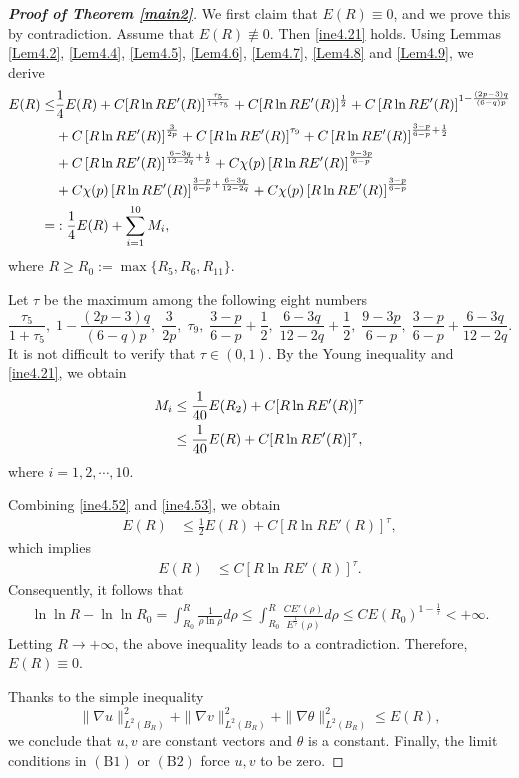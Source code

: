 \documentclass[11pt,reqno]{amsart}
\numberwithin{Thm}{section}
\begin{document}
\begin{proof}[{\bf Proof of Theorem \ref{main2}}]
We first claim that $E(R)\equiv0$, and we prove this by contradiction.
Assume that $E(R)\not\equiv0$. Then \eqref{ine4.21} holds. Using Lemmas \ref{Lem4.2}, \ref{Lem4.4}, \ref{Lem4.5}, \ref{Lem4.6}, \ref{Lem4.7}, \ref{Lem4.8} and \ref{Lem4.9}, we derive
\begin{align}\label{ine4.52}
E(R)\leq &\frac{1}{4} E(R)+C[R\ln RE'(R)]^\frac{\tau_5}{1+\tau_5}+C[R\ln RE'(R)]^\frac{1}{2}+C\left[R\ln R E'(R)\right]^{1-\frac{(2p-3)q}{(6-q)p}}\notag\\
&+C\left[R\ln R E'(R)\right]^\frac{3}{2p}+C\left[R\ln RE'(R)\right]^{\tau_9}+C\left[R\ln RE'(R)\right]^{\frac{3-p}{6-p}+\frac{1}{2}}\notag\\
&+C\left[R\ln RE'(R)\right]^{\frac{6-3q}{12-2q}+\frac{1}{2}}+C\chi(p)\left[R\ln RE'(R)\right]^\frac{9-3p}{6-p}\\
&+C\chi(p)\left[R\ln RE'(R)\right]^{\frac{3-p}{6-p}+\frac{6-3q}{12-2q}}+C\chi(p)\left[R\ln RE'(R)\right]^{\frac{3-p}{6-p}}\notag\\
=&:\frac{1}{4} E(R)+\sum_{i=1}^{10}M_i,\notag
\end{align}
where $R\geq R_0:=\max\{R_5,R_6,R_{11}\}$.


Let $\tau$ be the maximum among the following eight numbers
$$
\frac{\tau_5}{1+\tau_5},\;1-\frac{(2p-3)q}{(6-q)p},\;\frac{3}{2p},\;\tau_9,\;\frac{3-p}{6-p}+\frac{1}{2},\;\frac{6-3q}{12-2q}+\frac{1}{2},\;\frac{9-3p}{6-p},\; \frac{3-p}{6-p}+\frac{6-3q}{12-2q}.
$$
It is not difficult to verify that $\tau\in(0,1)$.
By the Young inequality and \eqref{ine4.21}, we obtain
\begin{align}\label{ine4.53}
	M_i&\leq \frac{1}{40}E(R_2)+C[R\ln R E'(R)]^\tau\notag\\
&\leq \frac{1}{40}E(R)+C[R\ln R E'(R)]^\tau,
\end{align}
where  $i=1,2,\cdots,10$.


Combining \eqref{ine4.52} and \eqref{ine4.53}, we obtain
\begin{align*}
E(R)&\leq \frac{1}{2}E(R)+C[R\ln R E'(R)]^\tau,
\end{align*}
	which implies
	\begin{align*}
		E(R)
		&\leq C\left[R\ln RE'(R)\right]^\tau.
	\end{align*}
	Consequently, it follows that
	\begin{align*}
		\ln\ln R-\ln\ln R_0=\int_{R_0}^{R}\frac{1}{\rho\ln\rho}d\rho\leq\int_{R_0}^{R}\frac{CE'(\rho)}{E^{\frac{1}{\tau}}(\rho)}d\rho\leq CE(R_0)^{1-\frac{1}{\tau}}<+\infty.
	\end{align*}
	Letting $R\rightarrow+\infty$, the above inequality leads to a contradiction. Therefore, $E(R)\equiv0$.
	
	Thanks to the simple inequality
	$$\|\nabla u\|_{L^2(B_R)}^2+\|\nabla v\|_{L^2(B_R)}^2+\|\nabla \theta\|_{L^2(B_R)}^2\leq E(R),$$
	we conclude that $u,v$ are constant vectors and $\theta$ is a constant. Finally, the limit conditions in $\mathrm{(B1)}$ or $\mathrm{(B2)}$ force $u,v$ to be zero.
\end{proof}
\end{document}
